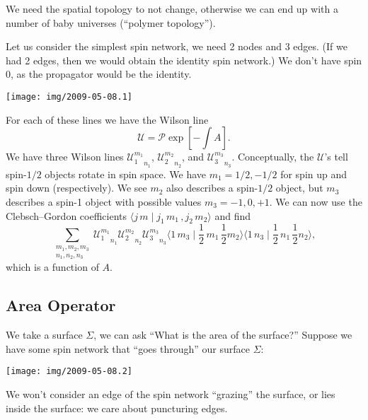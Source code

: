 \lecture

We need the spatial topology to not change, otherwise we can end up with
a number of baby universes (``polymer topology'').

Let us consider the simplest spin network, we need 2 nodes and 3
edges. (If we had 2 edges, then we would obtain the identity spin
network.)
We don't have spin 0, as the propagator would be the identity.
\begin{center}
  \texttt{[image: img/2009-05-08.1]}
\end{center}
For each of these lines we have the Wilson line
\begin{equation}
\mathcal{U} = \mathcal{P}\exp[-\int A].
\end{equation}
We have three Wilson lines ${\mathcal{U}^{m_{1}}_{1}}_{n_{1}}$,
${\mathcal{U}^{m_{2}}_{2}}_{n_{2}}$, and ${\mathcal{U}^{m_{3}}_{3}}_{n_{3}}$.
Conceptually, the $\mathcal{U}$'s tell spin-$1/2$ objects rotate in spin
space. We have $m_{1}=1/2, -1/2$ for spin up and spin down (respectively).
We see $m_{2}$ also describes a spin-$1/2$ object, but $m_{3}$ describes
a spin-1 object with possible values $m_{3}=-1,0,+1$. We can now use the
Clebsch--Gordon coefficients $\langle j\,m\mid j_{1}\,m_{1}\,, j_{2}\,m_{2}\rangle$
and find
\begin{equation}
  \sum_{\substack{m_{1},m_{2},m_{3}\\ n_{1},n_{2},n_{3}}}
  {\mathcal{U}^{m_{1}}_{1}}_{n_{1}}{\mathcal{U}^{m_{2}}_{2}}_{n_{2}}{\mathcal{U}^{m_{3}}_{3}}_{n_{3}}
\langle1\,m_{3}\mid\frac{1}{2}\,m_{1}\,\frac{1}{2}m_{2}\rangle
\langle1\,n_{3}\mid\frac{1}{2}\,n_{1}\,\frac{1}{2}n_{2}\rangle,
\end{equation}
which is a function of $A$.

\subsection{Area Operator}

We take a surface $\Sigma$, we can ask ``What is the area of the
surface?'' Suppose we have some spin network that ``goes through'' our
surface $\Sigma$:
\begin{center}
  \texttt{[image: img/2009-05-08.2]}
\end{center}
We won't consider an edge of the spin network ``grazing'' the surface,
or lies inside the surface: we care about puncturing edges.

